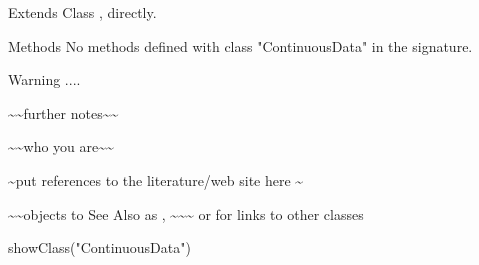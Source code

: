 \begin{Section}{Extends}
Class , directly.
\end{Section}
\begin{Section}{Methods}
No methods defined with class "ContinuousData" in the signature.
\end{Section}
\begin{Section}{Warning}
....
\end{Section}
\begin{Note}\relax
\textasciitilde{}\textasciitilde{}further notes\textasciitilde{}\textasciitilde{}
\end{Note}
\begin{Author}\relax
\textasciitilde{}\textasciitilde{}who you are\textasciitilde{}\textasciitilde{}
\end{Author}
\begin{References}\relax
\textasciitilde{}put references to the literature/web site here \textasciitilde{}
\end{References}
\begin{SeeAlso}\relax
\textasciitilde{}\textasciitilde{}objects to See Also as , \textasciitilde{}\textasciitilde{}\textasciitilde{}
or  for links to other classes
\end{SeeAlso}
\begin{Examples}
\begin{ExampleCode}
showClass("ContinuousData")
\end{ExampleCode}
\end{Examples}


